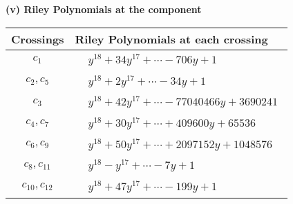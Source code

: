 \documentclass[1p]{elsarticle_modified}
\theoremstyle{definition}
\begin{document}
\flushleft \textbf{(v) Riley Polynomials at the component}\newline \\
\begin{tabular}{m{50pt}|m{274pt}}
Crossings & \hspace{64pt}Riley Polynomials at each crossing \\
\hline $$\begin{aligned}c_{1}\end{aligned}$$&$\begin{aligned}
&y^{18}+34 y^{17}+\cdots-706 y+1
\end{aligned}$\\
\hline $$\begin{aligned}c_{2},c_{5}\end{aligned}$$&$\begin{aligned}
&y^{18}+2 y^{17}+\cdots-34 y+1
\end{aligned}$\\
\hline $$\begin{aligned}c_{3}\end{aligned}$$&$\begin{aligned}
&y^{18}+42 y^{17}+\cdots-77040466 y+3690241
\end{aligned}$\\
\hline $$\begin{aligned}c_{4},c_{7}\end{aligned}$$&$\begin{aligned}
&y^{18}+30 y^{17}+\cdots+409600 y+65536
\end{aligned}$\\
\hline $$\begin{aligned}c_{6},c_{9}\end{aligned}$$&$\begin{aligned}
&y^{18}+50 y^{17}+\cdots+2097152 y+1048576
\end{aligned}$\\
\hline $$\begin{aligned}c_{8},c_{11}\end{aligned}$$&$\begin{aligned}
&y^{18}- y^{17}+\cdots-7 y+1
\end{aligned}$\\
\hline $$\begin{aligned}c_{10},c_{12}\end{aligned}$$&$\begin{aligned}
&y^{18}+47 y^{17}+\cdots-199 y+1
\end{aligned}$\\
\hline
\end{tabular}\\~\\
\end{document}
